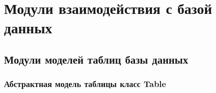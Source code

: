 \documentclass[letterpaper,10pt,russian]{sphinxmanual}
\begin{document}
\begin{quote}
\begin{sphinxVerbatim}[commandchars=\\\{\}]
\PYG{p}{[}\PYG{p}{]}   
\PYG{p}{[}\PYG{p}{]}   
\end{sphinxVerbatim}
\end{quote}

\sphinxstepscope

\sphinxstepscope


\chapter{Модули взаимодействия с базой данных}
\label{\detokenize{database.sqlite3_interface:id1}}\label{\detokenize{database.sqlite3_interface::doc}}\label{\detokenize{database.sqlite3_interface::doc}}
\sphinxstepscope


\section{Модули моделей таблиц базы данных}
\label{\detokenize{database.sqlite3_interface.tables:id1}}\label{\detokenize{database.sqlite3_interface.tables::doc}}

\subsection{Абстрактная модель таблицы \sphinxhyphen{} класс Table}
\label{\detokenize{database.sqlite3_interface.tables:module-database.sqlite3_interface.tables.table}}\label{\detokenize{database.sqlite3_interface.tables:table}}
\end{document}
